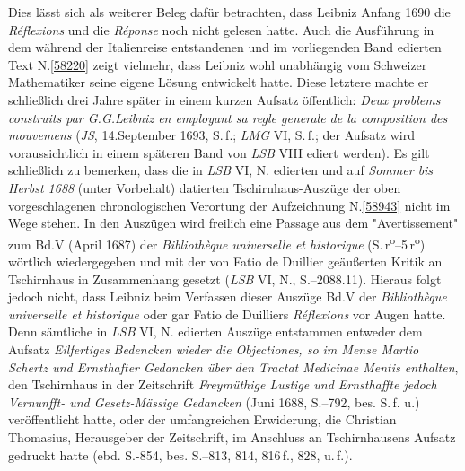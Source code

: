 Dies lässt sich als weiterer Beleg dafür betrachten, dass Leibniz Anfang 1690 die \textit{Réflexions}\cite{02539} und die \textit{Réponse}\cite{02540} noch nicht gelesen hatte.
Auch die Ausführung in dem während der Italienreise entstandenen und im vorliegenden Band edierten Text N.\;\ref{58220} %
zeigt vielmehr, dass Leibniz wohl unabhängig vom Schweizer Mathematiker seine eigene Lösung entwickelt hatte.
Diese letztere machte er schließlich drei Jahre später in einem kurzen Aufsatz öffentlich: %
\textit{Deux problems construits par G.\:G.\;Leibniz en employant sa regle generale de la composition des mouvemens} (\textit{JS}, 14.\;September 1693, S.\,f.; \textit{LMG} VI, S.\,f.;\cite{00545} der Aufsatz wird voraussichtlich in einem späteren Band von \textit{LSB} VIII ediert werden).
\pend%
\pstart%
Es gilt schließlich zu bemerken, dass die in \textit{LSB} VI, N.\cite{02546} edierten und auf \textit{Sommer bis Herbst 1688} (unter Vorbehalt) datierten Tschirnhaus-Auszüge der oben vorgeschlagenen chronologischen Verortung der Aufzeichnung N.\;\ref{58943} nicht im Wege stehen.
In den Auszügen wird freilich eine Passage aus dem "Avertissement" zum Bd.\;V (April 1687) der \textit{Bibliothèque universelle et historique} (S.\,r\textsuperscript{o}--5\,r\textsuperscript{o})\cite{02545} wörtlich wiedergegeben und mit der von Fatio de Duillier geäußerten Kritik an Tschirnhaus in Zusammenhang gesetzt (\textit{LSB} VI, N., S.--2088.11).\cite{02546}
Hieraus folgt jedoch nicht, dass Leibniz beim Verfassen dieser Auszüge Bd.\;V der \textit{Bibliothèque universelle et historique}\cite{02545} oder gar Fatio de Duilliers \textit{Réflexions}\cite{02539} vor Augen hatte.
Denn sämtliche in \textit{LSB} VI, N.\cite{02546} edierten Auszüge entstammen entweder dem Aufsatz \textit{Eilfertiges Bedencken wieder die Objectiones, so im Mense Martio Schertz und Ernsthafter Gedancken über den Tractat Medicinae Mentis enthalten}, den Tschirnhaus in der Zeitschrift \textit{Freymüthige Lustige und Ernsthaffte jedoch Vernunfft- und Gesetz-Mässige Gedancken} (Juni 1688, S.--792, bes. S.\,f. u.)\cite{02547} veröffentlicht hatte, oder der umfangreichen Erwiderung, die Christian Thomasius, Herausgeber der Zeitschrift, im Anschluss an Tschirnhausens Aufsatz gedruckt hatte (ebd. S.-854, bes. S.--813, 814, 816\,f., 828, u.\,f.).\cite{02548}

